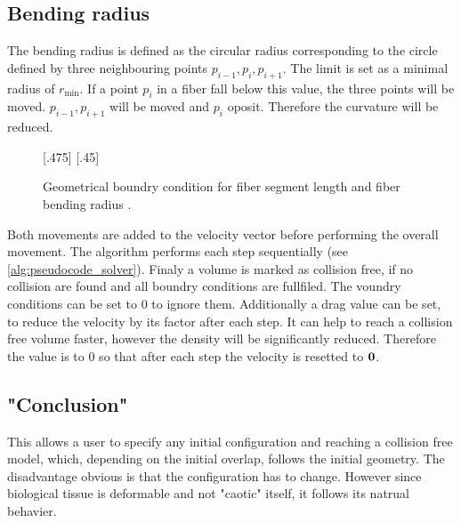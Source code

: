 \subsection{Bending radius}
% 
The bending radius is defined as the circular radius corresponding to the circle defined by three neighbouring points $p_{i-1}, p_{i}, p_{i+1}$. 
The limit is set as a minimal radius of $r_{\min}$.
If a point $p_{i}$ in a fiber fall below this value, the three points will be moved.
$p_{i-1},p_{i+1}$ will be moved \dummy and $p_{i}$ oposit.
Therefore the curvature will be reduced.
% 
\begin{figure}[!t]
    \centering
    \def\tikzheight{.40\textwidth}
    [.475\textwidth]{
    }\hfill
    [.45\textwidth]{
    }
	\caption{Geometrical boundry condition for fiber segment length \segLength and fiber bending radius \segRadius.}
	\label{fig:model_circle}
\end{figure}
% 
\newline
Both movements are added to the velocity vector before performing the overall movement.
The algorithm performs each step sequentially (see \cref{alg:pseudocode_solver}).
% 
Finaly a volume is marked as collision free, if no collision are found and all boundry conditions are fullfiled. 
The voundry conditions can be set to 0 to ignore them.
Additionally a drag value can be set, to reduce the velocity by its factor after each step.
It can help to reach a collision free volume faster, however the density will be significantly reduced.
Therefore the value is to 0 so that after each step the velocity is resetted to $\mathbf{0}$. 
% 
\subsection{"Conclusion"}
This allows a user to specify any initial configuration and reaching a collision free model, which, depending on the initial overlap, follows the initial geometry.
The disadvantage obvious is that the configuration has to change.
However since biological tissue is deformable and not "caotic" itself, it follows its natrual behavier.
% 
